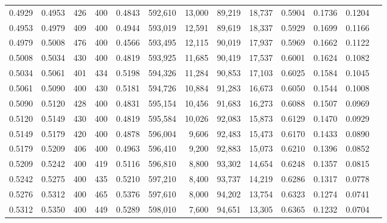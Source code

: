 \begin{tabular}{rrrrrrrrrrrrr}
0.4929 & 0.4953 &    426 &   400 &                                     0.4843 & 592,610 &  13,000 &  89,219 &  18,737 & 0.5904 & 0.1736 & 0.1204 \\
0.4953 & 0.4979 &    409 &   400 &                                     0.4944 & 593,019 &  12,591 &  89,619 &  18,337 & 0.5929 & 0.1699 & 0.1166 \\
0.4979 & 0.5008 &    476 &   400 &                                     0.4566 & 593,495 &  12,115 &  90,019 &  17,937 & 0.5969 & 0.1662 & 0.1122 \\
0.5008 & 0.5034 &    430 &   400 &                                     0.4819 & 593,925 &  11,685 &  90,419 &  17,537 & 0.6001 & 0.1624 & 0.1082 \\
0.5034 & 0.5061 &    401 &   434 &                                     0.5198 & 594,326 &  11,284 &  90,853 &  17,103 & 0.6025 & 0.1584 & 0.1045 \\
0.5061 & 0.5090 &    400 &   430 &                                     0.5181 & 594,726 &  10,884 &  91,283 &  16,673 & 0.6050 & 0.1544 & 0.1008 \\
0.5090 & 0.5120 &    428 &   400 &                                     0.4831 & 595,154 &  10,456 &  91,683 &  16,273 & 0.6088 & 0.1507 & 0.0969 \\
0.5120 & 0.5149 &    430 &   400 &                                     0.4819 & 595,584 &  10,026 &  92,083 &  15,873 & 0.6129 & 0.1470 & 0.0929 \\
0.5149 & 0.5179 &    420 &   400 &                                     0.4878 & 596,004 &   9,606 &  92,483 &  15,473 & 0.6170 & 0.1433 & 0.0890 \\
0.5179 & 0.5209 &    406 &   400 &                                     0.4963 & 596,410 &   9,200 &  92,883 &  15,073 & 0.6210 & 0.1396 & 0.0852 \\
0.5209 & 0.5242 &    400 &   419 &                                     0.5116 & 596,810 &   8,800 &  93,302 &  14,654 & 0.6248 & 0.1357 & 0.0815 \\
0.5242 & 0.5275 &    400 &   435 &                                     0.5210 & 597,210 &   8,400 &  93,737 &  14,219 & 0.6286 & 0.1317 & 0.0778 \\
0.5276 & 0.5312 &    400 &   465 &                                     0.5376 & 597,610 &   8,000 &  94,202 &  13,754 & 0.6323 & 0.1274 & 0.0741 \\
0.5312 & 0.5350 &    400 &   449 &                                     0.5289 & 598,010 &   7,600 &  94,651 &  13,305 & 0.6365 & 0.1232 & 0.0704 \\

\end{tabular}
